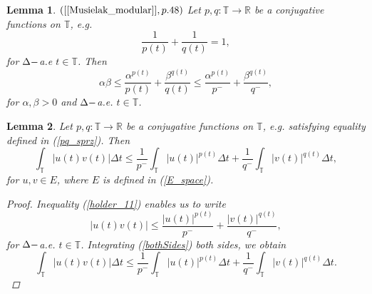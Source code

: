 \documentclass[12pt,a4paper,oneside,titlepage]{article}
\newtheorem{Lemat}{Lemma}
\begin{document}
\begin{Lemat}
\label{lemat_holder_1}
$([\ref{Musielak_modular}], p.48)$ Let $p,q:\mathbb{T} \rightarrow \mathbb{R}$ be a conjugative functions on $\mathbb{T}$, e.g.  
\begin{equation}
\label{pq_sprz}
\frac{1}{p(t)} + \frac{1}{q(t)} =1 ,
\end{equation}
for $\Delta \-- $a.e $t \in \mathbb{T}$.
Then 
\begin{equation}
\label{holder_11}
\alpha \beta \leq \frac{\alpha^{p(t)}}{p(t)} + \frac{\beta^{q(t)}}{q(t)} \leq \frac{\alpha^{p(t)}}{p^-} +   \frac{\beta^{q(t)}}{q^-},
\end{equation}
for $\alpha, \beta >0$ and $\Delta \-- $a.e. $t \in \mathbb{T}$.
\end{Lemat}
\begin{Lemat}
\label{lemat_holder_2}
 Let $p,q:\mathbb{T} \rightarrow \mathbb{R}$ be a conjugative functions on $\mathbb{T}$, e.g.  
satisfying equality defined in (\ref{pq_sprz}).
Then 
\begin{equation}
\label{holder_21}
\nonumber
\int_{\mathbb{T}} \vert u(t) v(t) \vert \Delta t \leq \frac{1}{p^-} \int_{\mathbb{T}} \vert u(t) \vert^{p(t)} \Delta t + \frac{1}{q^-} \int_{\mathbb{T}} \vert v(t) \vert^{q(t)} \Delta t ,
\end{equation}
for $u,v \in E$, where $E$ is defined in (\ref{E_space}).
\begin{proof}
Inequality (\ref{holder_11}) enables us to write
\begin{equation}
\label{bothSides}
\vert u(t) v(t) \vert \leq \frac{\vert u(t) \vert^{p(t)}}{p^-} + \frac{\vert v(t)\vert^{q(t)}}{q^-},
\end{equation}
for $\Delta \-- $a.e. $t \in \mathbb{T}$.
Integrating (\ref{bothSides}) both sides, we obtain
\begin{equation}
\label{poprawiona_nierownosc}
\int_{\mathbb{T}} \vert u(t) v(t) \vert \Delta t \leq \frac{1}{p^-} \int_{\mathbb{T}} \vert u(t) \vert^{p(t)} \Delta t + \frac{1}{q^-} \int_{\mathbb{T}} \vert v(t) \vert^{q(t)} \Delta t .
\end{equation}
\end{proof}
\end{Lemat}
\end{document}
